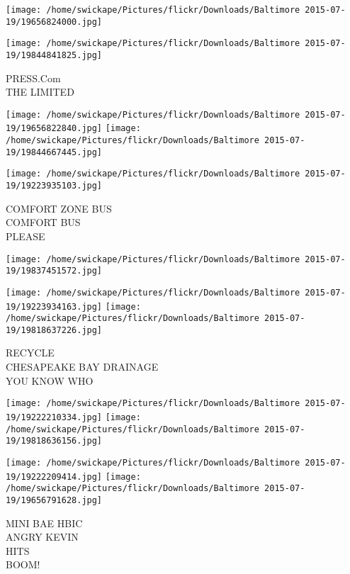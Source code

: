 \documentclass[10pt,letterpaper]{article}
\begin{document}
\texttt{[image: /home/swickape/Pictures/flickr/Downloads/Baltimore 2015-07-19/19656824000.jpg]}

\vspace{0.25in}
\texttt{[image: /home/swickape/Pictures/flickr/Downloads/Baltimore 2015-07-19/19844841825.jpg]}

PRESS.Com\\
THE LIMITED\\
\pagebreak

\texttt{[image: /home/swickape/Pictures/flickr/Downloads/Baltimore 2015-07-19/19656822840.jpg]}
\texttt{[image: /home/swickape/Pictures/flickr/Downloads/Baltimore 2015-07-19/19844667445.jpg]}

\vspace{0.25in}
\texttt{[image: /home/swickape/Pictures/flickr/Downloads/Baltimore 2015-07-19/19223935103.jpg]}

COMFORT ZONE BUS\\
COMFORT BUS\\
PLEASE\\
\pagebreak

\texttt{[image: /home/swickape/Pictures/flickr/Downloads/Baltimore 2015-07-19/19837451572.jpg]}

\vspace{0.25in}
\texttt{[image: /home/swickape/Pictures/flickr/Downloads/Baltimore 2015-07-19/19223934163.jpg]}
\texttt{[image: /home/swickape/Pictures/flickr/Downloads/Baltimore 2015-07-19/19818637226.jpg]}

RECYCLE\\
CHESAPEAKE BAY DRAINAGE\\
YOU KNOW WHO\\
\pagebreak

\texttt{[image: /home/swickape/Pictures/flickr/Downloads/Baltimore 2015-07-19/19222210334.jpg]}
\texttt{[image: /home/swickape/Pictures/flickr/Downloads/Baltimore 2015-07-19/19818636156.jpg]}

\texttt{[image: /home/swickape/Pictures/flickr/Downloads/Baltimore 2015-07-19/19222209414.jpg]}
\texttt{[image: /home/swickape/Pictures/flickr/Downloads/Baltimore 2015-07-19/19656791628.jpg]}

MINI BAE HBIC\\
ANGRY KEVIN\\
HITS\\
BOOM!\\
\pagebreak
\end{document}
